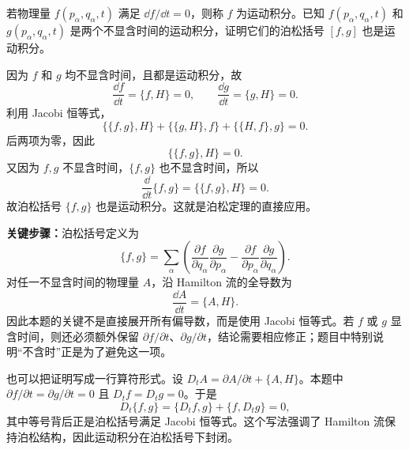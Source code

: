 \begin{question}[泊松括号与运动积分]
若物理量 $f(p_\alpha,q_\alpha,t)$ 满足 $\dd f/\dd t=0$，则称 $f$ 为运动积分。已知 $f(p_\alpha,q_\alpha,t)$ 和 $g(p_\alpha,q_\alpha,t)$ 是两个不显含时间的运动积分，证明它们的泊松括号 $[f,g]$ 也是运动积分。

\begin{solution}
因为 $f$ 和 $g$ 均不显含时间，且都是运动积分，故
\[
  \frac{\dd f}{\dd t}=\{f,H\}=0,
  \qquad
  \frac{\dd g}{\dd t}=\{g,H\}=0.
\]
利用 Jacobi 恒等式，
\[
  \{\{f,g\},H\}+\{\{g,H\},f\}+\{\{H,f\},g\}=0.
\]
后两项为零，因此
\[
  \{\{f,g\},H\}=0.
\]
又因为 $f,g$ 不显含时间，$\{f,g\}$ 也不显含时间，所以
\[
  \frac{\dd}{\dd t}\{f,g\}=\{\{f,g\},H\}=0.
\]
故泊松括号 $\{f,g\}$ 也是运动积分。这就是泊松定理的直接应用。


\medskip
\textbf{关键步骤：}泊松括号定义为
\[
  \{f,g\}=\sum_\alpha\left(
  \frac{\partial f}{\partial q_\alpha}\frac{\partial g}{\partial p_\alpha}
  -\frac{\partial f}{\partial p_\alpha}\frac{\partial g}{\partial q_\alpha}
  \right).
\]
对任一不显含时间的物理量 $A$，沿 Hamilton 流的全导数为
\[
  \frac{\dd A}{\dd t}=\{A,H\}.
\]
因此本题的关键不是直接展开所有偏导数，而是使用 Jacobi 恒等式。若 $f$ 或 $g$ 显含时间，则还必须额外保留 $\partial f/\partial t$、$\partial g/\partial t$，结论需要相应修正；题目中特别说明“不含时”正是为了避免这一项。


\medskip
也可以把证明写成一行算符形式。设 $D_t A=\partial A/\partial t+\{A,H\}$。本题中 $\partial f/\partial t=\partial g/\partial t=0$ 且 $D_tf=D_tg=0$。于是
\[
  D_t\{f,g\}=\{D_tf,g\}+\{f,D_tg\}=0,
\]
其中等号背后正是泊松括号满足 Jacobi 恒等式。这个写法强调了 Hamilton 流保持泊松结构，因此运动积分在泊松括号下封闭。
\end{solution}
\end{question}

